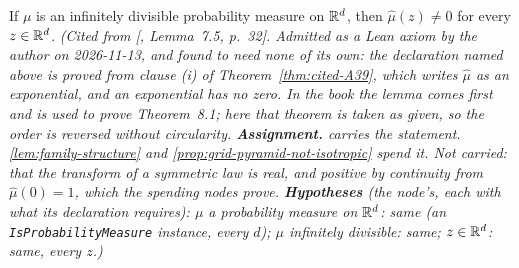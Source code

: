 \begin{theorem}
\label{thm:cited-A40}
\leanok
{}
If $\mu$ is an infinitely divisible probability measure on $\mathbb{R}^d$, then $\widehat\mu(z) \ne 0$ for
every $z \in \mathbb{R}^d$.
\statusA\quad{}\quad\emph{(Cited from [, Lemma~7.5, p.~32]. Admitted
as a Lean axiom by the author on 2026-11-13, and found to need none of its own: the declaration
named above is proved from clause (i) of Theorem~\ref{thm:cited-A39}, which writes $\widehat\mu$ as an
exponential, and an exponential has no zero. In the book the lemma comes first and is used to prove
Theorem~8.1; here that theorem is taken as given, so the order is reversed without circularity.
\textbf{Assignment.} 
carries the statement. \ref{lem:family-structure} and \ref{prop:grid-pyramid-not-isotropic} spend
it. Not carried: that the transform of a symmetric law is real, and positive by continuity from
$\widehat\mu(0) = 1$, which the spending nodes prove.
\textbf{Hypotheses} (the node's, each with what its declaration requires): $\mu$ a probability measure
on $\mathbb{R}^d$: same (an \texttt{IsProbabilityMeasure} instance, every $d$); $\mu$ infinitely
divisible: same; $z \in \mathbb{R}^d$: same, every $z$.)}
\end{theorem}

